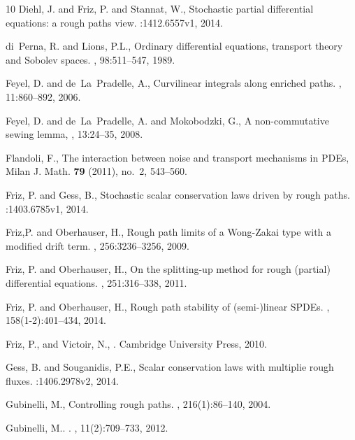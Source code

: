 \documentclass[11pt,a4paper]{amsart}
\theoremstyle{plain}%
\theoremstyle{definition}
\theoremstyle{remark}
\numberwithin{equation}{section} %
\begin{document}
\begin{thebibliography}{10}
Diehl, J. and Friz, P. and Stannat, W.,
\newblock Stochastic partial differential equations: a rough paths view.
:1412.6557v1, 2014.

di~Perna, R. and Lions, P.L.,
\newblock Ordinary differential equations, transport theory and {S}obolev spaces.
, 98:511--547, 1989.

Feyel, D. and de~La~Pradelle, A.,
\newblock Curvilinear integrals along enriched paths.
, 11:860--892, 2006.

Feyel, D. and de~La~Pradelle, A. and Mokobodzki, G.,
\newblock A non-commutative sewing lemma,
, 13:24--35, 2008.

 Flandoli, F.,
  \newblock The interaction between noise and transport mechanisms in PDEs, 
  \newblock Milan J. Math. {\bf 79} (2011), no.~2, 543--560. 

Friz, P. and Gess, B.,
\newblock Stochastic scalar conservation laws driven by rough paths.
:1403.6785v1, 2014.

Friz,P. and Oberhauser, H.,
\newblock Rough path limits of a {W}ong-{Z}akai type with a modified drift term.
, 256:3236--3256, 2009. 
 
Friz, P. and Oberhauser, H.,
\newblock On the splitting-up method for rough (partial) differential equations.
, 251:316--338, 2011.

Friz, P. and Oberhauser, H.,
\newblock Rough path stability of (semi-)linear SPDEs.
, 158(1-2):401--434, 2014.

 Friz, P.,  and  Victoir, N.,
.
\newblock Cambridge University Press, 2010.


Gess, B. and Souganidis, P.E.,
\newblock Scalar conservation laws with multiplie rough fluxes.
:1406.2978v2, 2014.

Gubinelli, M.,
\newblock Controlling rough paths.
, 216(1):86--140, 2004.


Gubinelli, M..
.
, 11(2):709--733, 2012.


\end{thebibliography}
\end{document}
